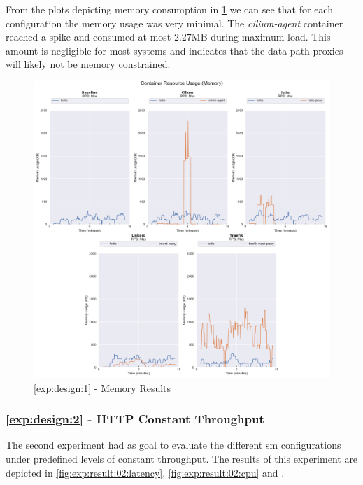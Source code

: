 From the plots depicting memory consumption in \cref{fig:exp:result:01:memory} we can see that for each configuration the memory usage was very minimal. The \textit{cilium-agent} container reached a spike and consumed at most $2.27$MB during maximum load. This amount is negligible for most systems and indicates that the data path proxies will likely not be memory constrained.

\begin{figure}[!t]
    \centering
    
    \includegraphics[width=\linewidth]{5_experimental_evaluation/figures/exp_01-memory-results.pdf}

    \caption{\ref{exp:design:1} - Memory Results}
    
    \label{fig:exp:result:01:memory}
\end{figure}



\subsubsection{\ref{exp:design:2} - HTTP Constant Throughput}
\label{sec:experiments:results:per-experiment:02}

The second experiment had as goal to evaluate the different \gls{sm} configurations under predefined levels of constant throughput. The results of this experiment are depicted in \cref{fig:exp:result:02:latency}, \cref{fig:exp:result:02:cpu} and \label{fig:exp:result:02:memory}.


